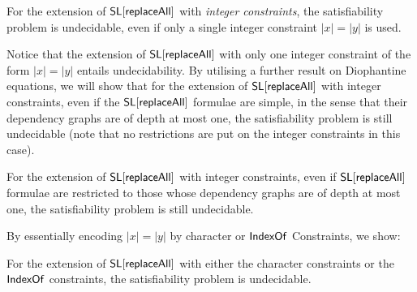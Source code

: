 \begin{theorem}\label{thm-ext-int}
	For the extension of $\mathsf{SL}[\mathsf{replaceAll}]$ with \emph{integer constraints}, the satisfiability problem is undecidable, even if only a single integer constraint $|x| = |y|$ is used.
\end{theorem}


%

Notice that the extension of $\mathsf{SL}[\mathsf{replaceAll}]$ with only one integer constraint of the form $|x| = |y|$ entails undecidability. By utilising a further result on Diophantine equations, we will show that for the extension of $\mathsf{SL}[\mathsf{replaceAll}]$ with integer constraints, even if the $\mathsf{SL}[\mathsf{replaceAll}]$ formulae are simple, in the sense that their dependency graphs are of depth at most one, the satisfiability problem is still undecidable (note that no restrictions are put on the integer constraints in this case).

%
 



\begin{theorem}\label{thm-ext-int-strong}
	For the extension of $\mathsf{SL}[\mathsf{replaceAll}]$ with integer constraints, even if $\mathsf{SL}[\mathsf{replaceAll}]$ formulae are restricted to those whose dependency graphs are of depth at most one, the satisfiability problem is still undecidable.
\end{theorem}

By essentially encoding $|x|=|y|$ by character or $\mathsf{IndexOf}$ Constraints, we show:

\begin{proposition}
	For the extension of $\mathsf{SL}[\mathsf{replaceAll}]$ with either the character constraints or the $\mathsf{IndexOf}$ constraints, the satisfiability problem is undecidable. 
\end{proposition}

